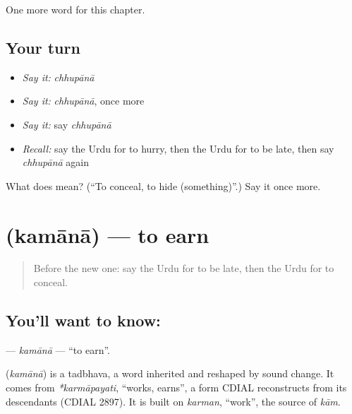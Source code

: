 \begin{grammarlens}[title={What you've built}]
One more word for this chapter.
\end{grammarlens}

\subsection*{Your turn}
\begin{itemize}
\raggedright
  \item \emph{Say it:} \emph{chhupānā}
  \item \emph{Say it:} \emph{chhupānā}, once more
  \item \emph{Say it:} say \emph{chhupānā}
  \item \emph{Recall:} say the Urdu for to hurry, then the Urdu for to be late, then say \emph{chhupānā} again
\end{itemize}

\begin{tcolorbox}[breakable,colback=teal!4,colframe=teal!35!black,title={Before you move on}]
What does  mean? (\textquotedblleft{}To conceal, to hide (something)\textquotedblright{}.) Say it once more.
\end{tcolorbox}
\section[\texorpdfstring{\ur{کمانا} (kamānā)}{کمانا (kamānā)}]{ (kamānā) — to earn}

\label{lesson:UR-C214-kamana}



\begin{quote}
Before the new one: say the Urdu for to be late, then the Urdu for to conceal.
\end{quote}

\subsection*{You'll want to know: }
\textbf{} — \emph{kamānā} — \textquotedblleft{}to earn\textquotedblright{}.

\begin{cousinweb}
\textbf{} (\emph{kamānā}) is a tadbhava, a word inherited and reshaped by sound change. It comes from \emph{*karmāpayati}, \textquotedblleft{}works, earns\textquotedblright{}, a form CDIAL reconstructs from its descendants (CDIAL 2897). It is built on \emph{karman}, \textquotedblleft{}work\textquotedblright{}, the source of \emph{kām}.
\end{cousinweb}

